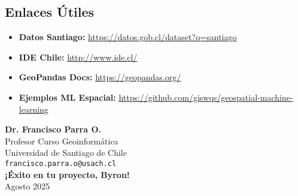 \documentclass[12pt,a4paper]{article}
\begin{document}
\subsection{Enlaces Útiles}

\begin{itemize}
    \item \textbf{Datos Santiago:} \url{https://datos.gob.cl/dataset?q=santiago}
    \item \textbf{IDE Chile:} \url{http://www.ide.cl/}
    \item \textbf{GeoPandas Docs:} \url{https://geopandas.org/}
    \item \textbf{Ejemplos ML Espacial:} \url{https://github.com/giswqs/geospatial-machine-learning}
\end{itemize}

\vspace{2cm}

\begin{flushright}
\textbf{Dr. Francisco Parra O.}\\
Profesor Curso Geoinformática\\
Universidad de Santiago de Chile\\
\texttt{francisco.parra.o@usach.cl}\\
\vspace{0.5cm}
\textbf{¡Éxito en tu proyecto, Byron!}\\
Agosto 2025
\end{flushright}
\end{document}
